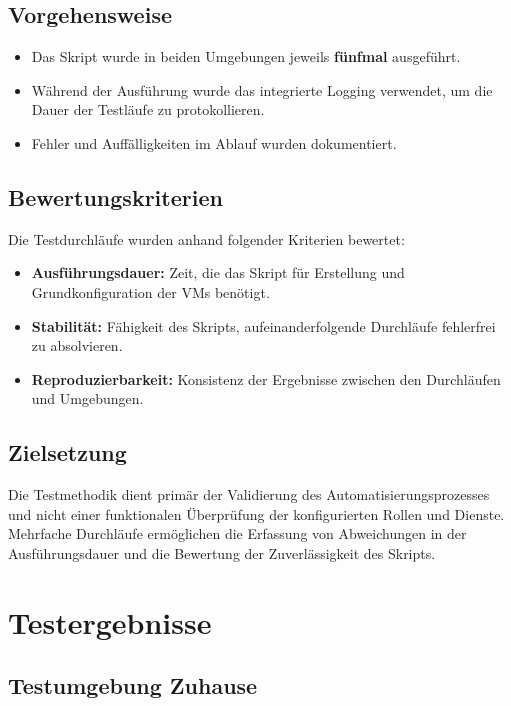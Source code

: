 \documentclass[conference]{IEEEtran}
\begin{document}
\section{Vorgehensweise}

\begin{itemize}
\item Das Skript wurde in beiden Umgebungen jeweils \textbf{fünfmal} ausgeführt.
\item Während der Ausführung wurde das integrierte Logging verwendet, um die Dauer der Testläufe zu protokollieren.
\item Fehler und Auffälligkeiten im Ablauf wurden dokumentiert.
\end{itemize}

\section{Bewertungskriterien}

Die Testdurchläufe wurden anhand folgender Kriterien bewertet:

\begin{itemize}
\item \textbf{Ausführungsdauer:} Zeit, die das Skript für Erstellung und Grundkonfiguration der VMs benötigt.
\item \textbf{Stabilität:} Fähigkeit des Skripts, aufeinanderfolgende Durchläufe fehlerfrei zu absolvieren.
\item \textbf{Reproduzierbarkeit:} Konsistenz der Ergebnisse zwischen den Durchläufen und Umgebungen.
\end{itemize}

\section{Zielsetzung}

Die Testmethodik dient primär der Validierung des Automatisierungsprozesses und nicht einer funktionalen Überprüfung der konfigurierten Rollen und Dienste. Mehrfache Durchläufe ermöglichen die Erfassung von Abweichungen in der Ausführungsdauer und die Bewertung der Zuverlässigkeit des Skripts.

\chapter{Testergebnisse}

\section{Testumgebung Zuhause}
\end{document}
